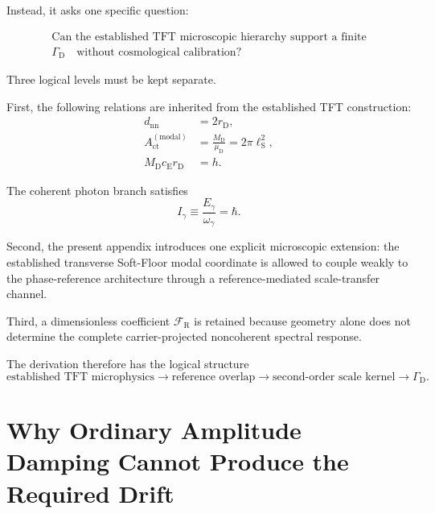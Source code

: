 Instead, it asks one specific question:

\begin{equation}
    \boxed{
    \begin{gathered}
        \text{Can the established TFT microscopic hierarchy support a finite}\\
        \Gamma_{\mathrm D}\quad
        \text{without cosmological calibration?}
    \end{gathered}
    }
\end{equation}

Three logical levels must be kept separate.

First, the following relations are inherited from the established TFT
construction:
\begin{align}
    d_{\mathrm{nn}}
    &=
    2r_{\mathrm D},
    \label{eq:AQ_dnn}
    \\
    A_{\mathrm{ct}}^{(\mathrm{modal})}
    &=
    \frac{M_{\mathrm D}}{\mu_{\mathrm D}}
    =
    2\pi\ell_{\mathrm S}^{2},
    \label{eq:AQ_Act}
    \\
    M_{\mathrm D}c_{\mathrm E}r_{\mathrm D}
    &=
    h.
    \label{eq:AQ_action_identity}
\end{align}

The coherent photon branch satisfies
\begin{equation}
    \boxed{
    I_{\gamma}
    \equiv
    \frac{E_{\gamma}}{\omega_{\gamma}}
    =
    \hbar.
    }
    \label{eq:AQ_photon_action}
\end{equation}

Second, the present appendix introduces one explicit microscopic extension:
the established transverse Soft-Floor modal coordinate is allowed to couple
weakly to the phase-reference architecture through a
reference-mediated scale-transfer channel.

Third, a dimensionless coefficient
$\mathcal F_{\mathrm R}$ is retained because geometry alone does not determine
the complete carrier-projected noncoherent spectral response.

The derivation therefore has the logical structure
\begin{equation}
    \boxed{
    \text{established TFT microphysics}
    \rightarrow
    \text{reference overlap}
    \rightarrow
    \text{second-order scale kernel}
    \rightarrow
    \Gamma_{\mathrm D}.
    }
    \label{eq:AQ_logic_chain}
\end{equation}


\section{Why Ordinary Amplitude Damping Cannot Produce the Required Drift}

